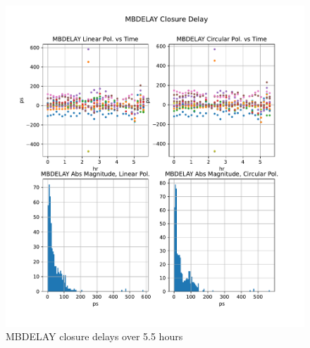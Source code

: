 \documentclass[letterpaper,twoside,12pt]{article}
\begin{document}
\begin{figure}[ht!]
  \begin{center}
  \includegraphics[width=40pc]{MBDELAY_Closure_Delay.pdf}
  \caption{\small MBDELAY closure delays over 5.5 hours }
  \label{mbd}
  \end{center}
\end{figure}
\end{document}
